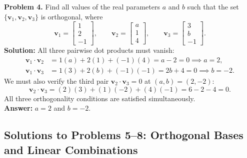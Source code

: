 \documentclass[11pt, letterpaper]{article}
\theoremstyle{definition}
\theoremstyle{remark}
\begin{document}
\textbf{Problem 4.} Find all values of the real parameters $a$ and $b$ such that the set $\{\mathbf{v}_1, \mathbf{v}_2, \mathbf{v}_3\}$ is orthogonal, where
\[
\mathbf{v}_1 = \begin{bmatrix} 1 \\ 2 \\ -1 \end{bmatrix}, \qquad
\mathbf{v}_2 = \begin{bmatrix} a \\ 1 \\ 4 \end{bmatrix}, \qquad
\mathbf{v}_3 = \begin{bmatrix} 3 \\ b \\ -1 \end{bmatrix}.
\]
\textbf{Solution:} All three pairwise dot products must vanish:
\begin{align*}
\mathbf{v}_1 \cdot \mathbf{v}_2 &= 1(a) + 2(1) + (-1)(4) = a - 2 = 0 \implies a = 2, \\
\mathbf{v}_1 \cdot \mathbf{v}_3 &= 1(3) + 2(b) + (-1)(-1) = 2b + 4 = 0 \implies b = -2.
\end{align*}
We must also verify the third pair $\mathbf{v}_2 \cdot \mathbf{v}_3 = 0$ at $(a, b) = (2, -2)$:
\[
\mathbf{v}_2 \cdot \mathbf{v}_3 = (2)(3) + (1)(-2) + (4)(-1) = 6 - 2 - 4 = 0.
\]
All three orthogonality conditions are satisfied simultaneously. \\
\textbf{Answer:} $a = 2$ and $b = -2$.

\subsection{Solutions to Problems 5--8: Orthogonal Bases and Linear Combinations}
\end{document}
